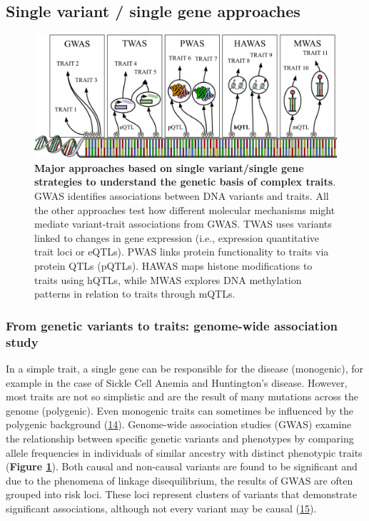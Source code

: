 \hypertarget{single-variant-single-gene-approaches}{%
\subsection{Single variant / single gene approaches}\label{single-variant-single-gene-approaches}}

\begin{figure}
\hypertarget{fig:fig1}{%
\centering
\includegraphics[width=1\textwidth,height=\textheight]{images/fig1.svg}
\caption{\textbf{Major approaches based on single variant/single gene strategies to understand the genetic basis of complex traits}.
GWAS identifies associations between DNA variants and traits.
All the other approaches test how different molecular mechanisms might mediate variant-trait associations from GWAS.
TWAS uses variants linked to changes in gene expression (i.e., expression quantitative trait loci or eQTLs).
PWAS links protein functionality to traits via protein QTLs (pQTLs).
HAWAS maps histone modifications to traits using hQTLs, while MWAS explores DNA methylation patterns in relation to traits through mQTLs.}\label{fig:fig1}
}
\end{figure}

\hypertarget{from-genetic-variants-to-traits-genome-wide-association-study}{%
\subsubsection{From genetic variants to traits: genome-wide association study}\label{from-genetic-variants-to-traits-genome-wide-association-study}}

In a simple trait, a single gene can be responsible for the disease (monogenic), for example in the case of Sickle Cell Anemia and Huntington's disease.
However, most traits are not so simplistic and are the result of many mutations across the genome (polygenic).
Even monogenic traits can sometimes be influenced by the polygenic background (\protect\hyperlink{ref-VqGYQMXO}{14}).
Genome-wide association studies (GWAS) examine the relationship between specific genetic variants and phenotypes by comparing allele frequencies in individuals of similar ancestry with distinct phenotypic traits (\textbf{Figure \ref{fig:fig1}}).
Both causal and non-causal variants are found to be significant and due to the phenomena of linkage disequilibrium, the results of GWAS are often grouped into risk loci.
These loci represent clusters of variants that demonstrate significant associations, although not every variant may be causal (\protect\hyperlink{ref-1873zCaaX}{15}).

